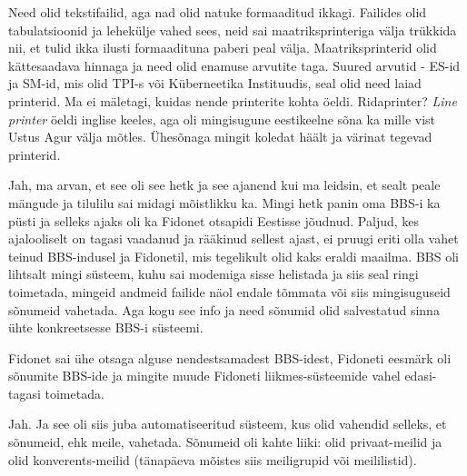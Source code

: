 
Need olid tekstifailid, aga nad olid natuke formaaditud ikkagi. Failides olid 
tabulatsioonid ja lehekülje vahed  sees, neid sai maatriksprinteriga välja 
trükkida nii, et tulid ikka ilusti formaadituna paberi peal välja. 
Maatriksprinterid olid kättesaadava hinnaga ja need olid enamuse arvutite taga. 
 Suured arvutid - ES-id ja SM-id, mis olid TPI-s või Küberneetika 
Instituudis, seal olid need laiad printerid. Ma ei mäletagi, kuidas nende 
printerite kohta öeldi. Ridaprinter? \emph{Line printer} öeldi inglise keeles, 
aga  oli mingisugune eestikeelne sõna ka mille vist Ustus Agur välja mõtles. Ühesõnaga mingit koledat häält ja värinat tegevad 
printerid.


Jah, ma arvan, et see oli see hetk ja see ajanend kui ma leidsin, et sealt  
peale mängude ja  tilulilu sai midagi mõistlikku ka. Mingi hetk panin oma BBS-i 
ka püsti ja selleks ajaks oli ka Fidonet otsapidi Eestisse 
jõudnud. Paljud, kes  ajalooliselt on tagasi vaadanud ja rääkinud 
sellest ajast, ei pruugi eriti olla vahet teinud BBS-indusel ja Fidonetil,  mis 
tegelikult  olid kaks eraldi maailma. BBS oli lihtsalt mingi 
süsteem, kuhu sai modemiga sisse helistada ja siis seal ringi toimetada,  
mingeid andmeid failide näol endale tõmmata või siis mingisuguseid sõnumeid 
vahetada. Aga kogu see info ja need sõnumid olid salvestatud sinna ühte 
konkreetsesse BBS-i süsteemi.

Fidonet sai ühe otsaga  alguse nendestsamadest BBS-idest, Fidoneti eesmärk 
oli sõnumite BBS-ide ja mingite muude Fidoneti liikmes-süsteemide vahel 
edasi-tagasi toimetada. 


Jah. Ja see oli siis juba automatiseeritud süsteem, kus olid vahendid 
selleks, et sõnumeid, ehk  meile, vahetada. Sõnumeid oli kahte liiki: olid 
privaat-meilid ja olid konverents-meilid (tänapäeva mõistes siis
meiligrupid või meililistid).

